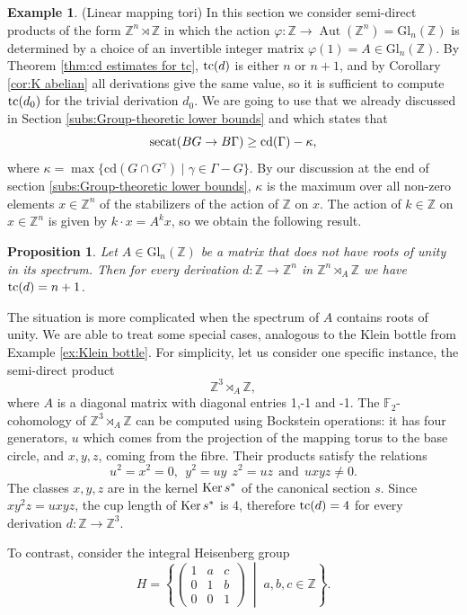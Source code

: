 \documentclass[11pt]{amsart}
\theoremstyle{plain}
\newtheorem{proposition}[theorem]{Proposition}
\theoremstyle{definition}
\newtheorem{example}[theorem]{Example}
\newcommand{\ZZ}{{\mathbb{Z}}}
\newcommand{\Ker}{\mathop{\rm Ker}\nolimits}
\newcommand{\secat}{\mathop{\rm secat}\nolimits}
\newcommand{\tc}{\mathop{\rm tc}\nolimits}
\newcommand{\cd}{\mathrm{cd}}
\DeclareMathOperator{\Aut}{Aut}
\begin{document}
\begin{example} (Linear mapping tori) In this section we consider semi-direct products of the form
$\ZZ^n\rtimes \ZZ$ in which the action $\varphi\colon\ZZ\to\Aut(\ZZ^n)=\mathrm{Gl}_n(\ZZ)$ is determined
by a choice of an invertible integer matrix $\varphi(1)=A\in \mathrm{Gl}_n(\ZZ)$. By
Theorem \ref{thm:cd estimates for tc}, $\tc(d)$ is either $n$ or $n+1$, and by Corollary 
\ref{cor:K abelian} all derivations give the same value, so it is sufficient to compute $\tc(d_0)$
for the trivial derivation $d_0$. We are going to use \cite[Thm. 5.2]{EBFMO} 
that we already discussed in Section \ref{subs:Group-theoretic lower bounds} and which states that
$$\secat(BG\to B\Gamma)\ge\cd(\Gamma)-\kappa, $$
where $\kappa=\max\{\cd(G\cap G^\gamma)\mid \gamma\in \Gamma-G\}.$ 
By our discussion at the end of section \ref{subs:Group-theoretic lower bounds}, 
$\kappa$ is the maximum over all non-zero elements $x\in\ZZ^n$ of the stabilizers of the action of 
$\ZZ$ on $x$. The action of $k\in\ZZ$ on $x\in\ZZ^n$ is given by $k\cdot x=A^kx$, so we obtain 
the following result.

\begin{proposition}
Let $A\in\mathrm{Gl}_n(\ZZ)$ be a matrix that does not have roots of unity in its
spectrum. 
Then for every derivation $d\colon\ZZ\to\ZZ^n$ in $\ZZ^n\rtimes_A\ZZ$ we have $\tc(d)=n+1$.
\end{proposition}


The situation is more complicated when the spectrum of $A$ contains roots of unity. We are able to treat
some special cases, analogous to the Klein bottle from Example \ref{ex:Klein bottle}. For simplicity,
let us consider one specific instance, the semi-direct product 
$$\ZZ^3\rtimes_A \ZZ,$$ 
where $A$ is a diagonal matrix with diagonal
entries 1,-1 and -1. The $\mathbb{F}_2$-cohomology of $\ZZ^3\rtimes_A \ZZ$ can be computed 
using Bockstein
operations: it has four generators, $u$ which comes from the projection of the mapping torus 
to the base circle,
and $x,y,z$, coming from the fibre. Their products satisfy the relations
$$u^2=x^2=0,\ \ y^2=uy  \ \ z^2=uz\ \ \text{and}\ \ uxyz\ne 0.$$
The classes $x,y,z$ are in the kernel $\Ker s^\ast$ of the canonical section $s$. Since
$xy^2z=uxyz$, the cup length of $\Ker s^\ast$ is 4, therefore $\tc(d)=4$ for every 
derivation $d\colon\ZZ\to \ZZ^3$.

To contrast, consider the integral Heisenberg group 
\[
H=\left\{
\begin{pmatrix}
1 & a & c\\
0 & 1 & b\\
0 & 0 & 1
\end{pmatrix}
\;\middle|\;
a,b,c\in\mathbb Z
\right\}.
\]


\end{example}
\end{document}
